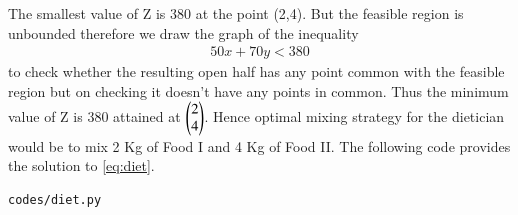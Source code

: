 \begin{enumerate}[label=\arabic*.,ref=\thesection.\theenumi]
The smallest value of Z is 380 at the point (2,4). But the feasible region is unbounded therefore we draw the graph of the inequality
\begin{align}
50x +70y<380
\end{align}
to check whether the resulting open half has any point common with the feasible region but on checking it doesn't have any points in common. 
Thus the minimum value of Z is 380 attained at $\begin{pmatrix}2\\4\end{pmatrix}$. Hence optimal mixing strategy for the dietician would be to mix 2 Kg of Food I and 4 Kg of Food II.  The following code provides the solution to \eqref{eq:diet}.
%
\begin{lstlisting}
codes/diet.py
\end{lstlisting}




\end{enumerate}
